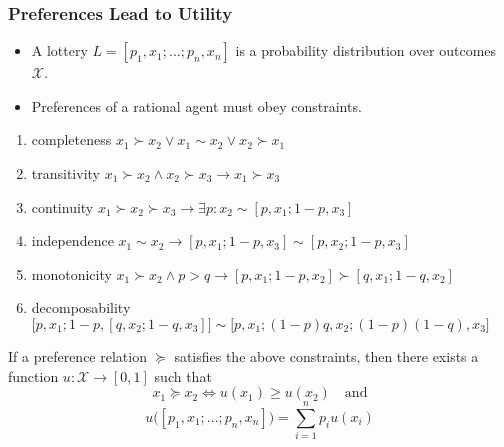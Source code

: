 \documentclass[UTF8,aspectratio=43,11pt,colorlinks,compress,openany]{beamer}%
\begin{document}
\begin{frame}\frametitle{Preferences Lead to Utility}
\setlength\abovedisplayskip{0pt}
\setlength\belowdisplayskip{0pt}\vspace*{-2pt}
\begin{itemize}
	\item A lottery $L=[p_1,x_1;\dots;p_n,x_n]$ is a probability distribution over outcomes $\mathcal{X}$.
	\item Preferences of a rational agent must obey constraints.
\end{itemize}
\begin{enumerate}
	\item completeness $x_1\succ x_2\vee x_1\sim x_2\vee x_2\succ x_1$
	\item transitivity $x_1\succ x_2\wedge x_2\succ x_3\to x_1\succ x_3$
	\item continuity $x_1\succ x_2\succ x_3\to\exists p: x_2\sim[p,x_1;1-p,x_3]$
	\item independence $x_1\sim x_2\to[p,x_1;1-p,x_3]\sim[p,x_2;1-p,x_3]$
	\item monotonicity $x_1\succ x_2\wedge p>q\to[p,x_1;1-p,x_2]\succ[q,x_1;1-q,x_2]$
	\item decomposability $\big[p,x_1;1-p,[q,x_2;1-q,x_3]\big]\sim\big[p,x_1;(1-p)q,x_2;(1-p)(1-q),x_3\big]$
\end{enumerate}\vspace*{-2pt}
\begin{theorem}
If a preference relation $\succeq$ satisfies the above constraints, then there exists a function $u:\mathcal{X}\to[0,1]$ such that
\[x_1\succeq x_2\iff u(x_1)\geq u(x_2)\quad\mbox{and}\]
\[u\big([p_1,x_1;\dots;p_n,x_n]\big)=\sum\limits_{i=1}^n p_i u(x_i)\]
\end{theorem}
\end{frame}
\end{document}
